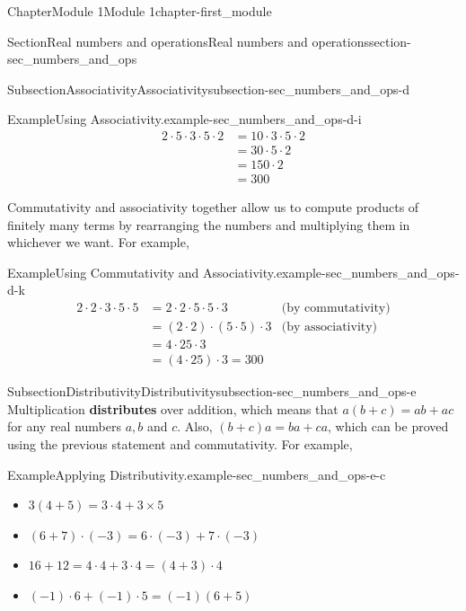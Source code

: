 \documentclass[oneside,10pt,]{book}
\newcommand{\terminology}[1]{\textbf{#1}}
\begin{document}
\begin{chapterptx}{Chapter}{Module 1}{}{Module 1}{}{}{chapter-first_module}
\begin{sectionptx}{Section}{Real numbers and operations}{}{Real numbers and operations}{}{}{section-sec_numbers_and_ops}
\begin{subsectionptx}{Subsection}{Associativity}{}{Associativity}{}{}{subsection-sec_numbers_and_ops-d}
\begin{example}{Example}{Using Associativity.}{example-sec_numbers_and_ops-d-i}
\begin{equation*}
\begin{aligned}
2 \cdot 5 \cdot 3 \cdot 5 \cdot 2 &= 10\cdot 3 \cdot 5 \cdot 2 \\
&= 30 \cdot 5 \cdot 2 \\
&= 150 \cdot 2 \\
&= 300
\end{aligned}
\end{equation*}
%
\end{example}
Commutativity and associativity together allow us to compute products of finitely many terms by rearranging the numbers and multiplying them in whichever we want.  For example,%
\begin{example}{Example}{Using Commutativity and Associativity.}{example-sec_numbers_and_ops-d-k}%
%
\begin{equation*}
\begin{aligned}
2 \cdot 2 \cdot 3 \cdot 5 \cdot 5 &= 2 \cdot 2 \cdot 5 \cdot 5 \cdot 3  &\text{(by commutativity)} \\
&= (2 \cdot 2) \cdot (5 \cdot 5) \cdot 3  &\text{(by associativity)} \\
&= 4 \cdot 25 \cdot 3 \\
&= (4 \cdot 25) \cdot 3  = 300
\end{aligned}
\end{equation*}
%
\end{example}
\end{subsectionptx}
%
%
\typeout{************************************************}
\typeout{************************************************}
%
\begin{subsectionptx}{Subsection}{Distributivity}{}{Distributivity}{}{}{subsection-sec_numbers_and_ops-e}
Multiplication \terminology{distributes} over addition, which means that \(a (b + c) = ab + a c\) for any real numbers \(a, b\) and \(c\).  Also, \((b + c) a = ba + ca\), which can be proved using the previous statement and commutativity.  For example,%
\begin{example}{Example}{Applying Distributivity.}{example-sec_numbers_and_ops-e-c}%
%
\begin{itemize}[label=\textbullet]
\item{}\(\displaystyle 3(4 + 5) = 3 \cdot 4 + 3 \times 5\)%
\item{}\(\displaystyle (6 + 7) \cdot (-3) = 6 \cdot (-3) + 7 \cdot (-3)\)%
\item{}\(\displaystyle 16 + 12 = 4 \cdot 4 + 3 \cdot 4 = (4 + 3) \cdot 4\)%
\item{}\(\displaystyle (-1)\cdot 6 + (-1) \cdot 5 = (-1)(6 + 5)\)%

\end{itemize}
\end{example}
\end{subsectionptx}
\end{sectionptx}
\end{chapterptx}
\end{document}

